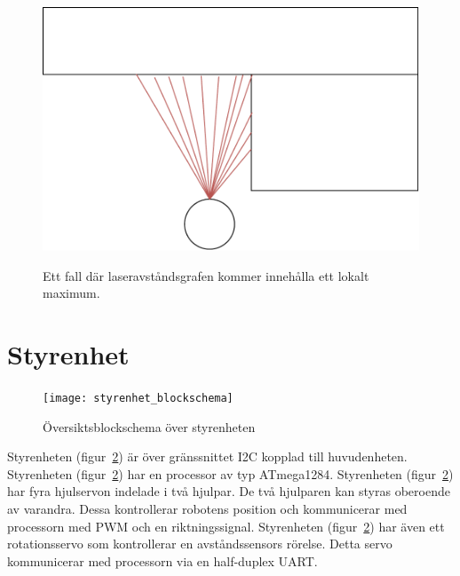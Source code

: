\documentclass{article}
\begin{document}
\begin{figure}[H]
  \centering
  \includegraphics[scale=0.5]{LaserLokaltMaximum} \\
  \caption{Ett fall där laseravståndsgrafen kommer innehålla ett lokalt maximum.}
  \label{fig:LaserLokaltMaximum}
\end{figure}



\section{Styrenhet}
\begin{figure}[H]
\centering
\texttt{[image: styrenhet\_blockschema]}
\caption{Översiktsblockschema över styrenheten}
\label{fig:styrenhet}
\end{figure}
Styrenheten (figur~\ref{fig:styrenhet}) är över gränssnittet I2C kopplad till huvudenheten.\newline\newline
Styrenheten (figur~\ref{fig:styrenhet}) har en processor av typ ATmega1284.\newline\newline
Styrenheten (figur~\ref{fig:styrenhet}) har fyra hjulservon indelade i två hjulpar. De två hjulparen kan styras oberoende av varandra. Dessa kontrollerar robotens position och kommunicerar med processorn med PWM och en riktningssignal.\newline\newline
Styrenheten (figur~\ref{fig:styrenhet}) har även ett rotationsservo som kontrollerar en avståndssensors rörelse. Detta servo kommunicerar med processorn via en half-duplex UART.\newline\newline
\end{document}
